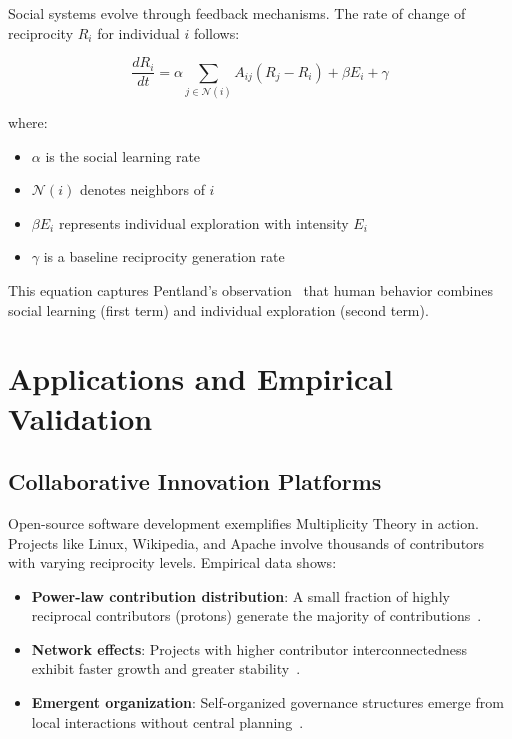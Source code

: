 \documentclass[11pt,a4paper]{article}
\begin{document}
Social systems evolve through feedback mechanisms. The rate of change of reciprocity $R_i$ for individual $i$ follows:

\begin{equation}
\frac{dR_i}{dt} = \alpha \sum_{j \in \mathcal{N}(i)} A_{ij} (R_j - R_i) + \beta E_i + \gamma
\end{equation}

where:
\begin{itemize}
    \item $\alpha$ is the social learning rate
    \item $\mathcal{N}(i)$ denotes neighbors of $i$
    \item $\beta E_i$ represents individual exploration with intensity $E_i$
    \item $\gamma$ is a baseline reciprocity generation rate
\end{itemize}

This equation captures Pentland's observation~\cite{pentland2014} that human behavior combines social learning (first term) and individual exploration (second term).

\section{Applications and Empirical Validation}
\label{sec:applications}

\subsection{Collaborative Innovation Platforms}

Open-source software development exemplifies Multiplicity Theory in action. Projects like Linux, Wikipedia, and Apache involve thousands of contributors with varying reciprocity levels. Empirical data shows:

\begin{itemize}
    \item \textbf{Power-law contribution distribution}: A small fraction of highly reciprocal contributors (protons) generate the majority of contributions~\cite{barabasi2016}.
    \item \textbf{Network effects}: Projects with higher contributor interconnectedness exhibit faster growth and greater stability~\cite{raymond1999}.
    \item \textbf{Emergent organization}: Self-organized governance structures emerge from local interactions without central planning~\cite{benkler2006}.
\end{itemize}
\end{document}
